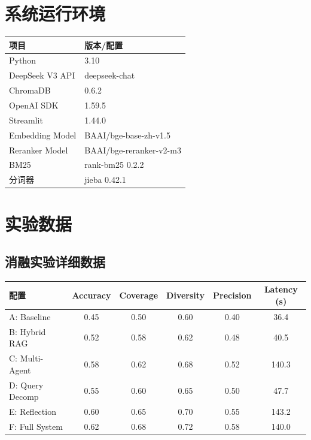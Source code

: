 \documentclass[12pt,a4paper]{article}
\begin{document}
\newpage
\appendix
\section{系统运行环境}
\label{app:env}

\begin{table}[H]
    \centering
    \begin{tabular}{ll}
        \toprule
        \textbf{项目} & \textbf{版本/配置} \\
        \midrule
        Python & 3.10 \\
        DeepSeek V3 API & deepseek-chat \\
        ChromaDB & 0.6.2 \\
        OpenAI SDK & 1.59.5 \\
        Streamlit & 1.44.0 \\
        Embedding Model & BAAI/bge-base-zh-v1.5 \\
        Reranker Model & BAAI/bge-reranker-v2-m3 \\
        BM25 & rank-bm25 0.2.2 \\
        分词器 & jieba 0.42.1 \\
        \bottomrule
    \end{tabular}
\end{table}

\section{实验数据}
\label{app:data}

\subsection{消融实验详细数据}

\begin{table}[H]
    \centering
    \begin{tabular}{lccccc}
        \toprule
        \textbf{配置} & \textbf{Accuracy} & \textbf{Coverage} & \textbf{Diversity} & \textbf{Precision} & \textbf{Latency (s)} \\
        \midrule
        A: Baseline & 0.45 & 0.50 & 0.60 & 0.40 & 36.4 \\
        B: Hybrid RAG & 0.52 & 0.58 & 0.62 & 0.48 & 40.5 \\
        C: Multi-Agent & 0.58 & 0.62 & 0.68 & 0.52 & 140.3 \\
        D: Query Decomp & 0.55 & 0.60 & 0.65 & 0.50 & 47.7 \\
        E: Reflection & 0.60 & 0.65 & 0.70 & 0.55 & 143.2 \\
        F: Full System & 0.62 & 0.68 & 0.72 & 0.58 & 140.0 \\
        \bottomrule
    \end{tabular}
\end{table}
\end{document}
